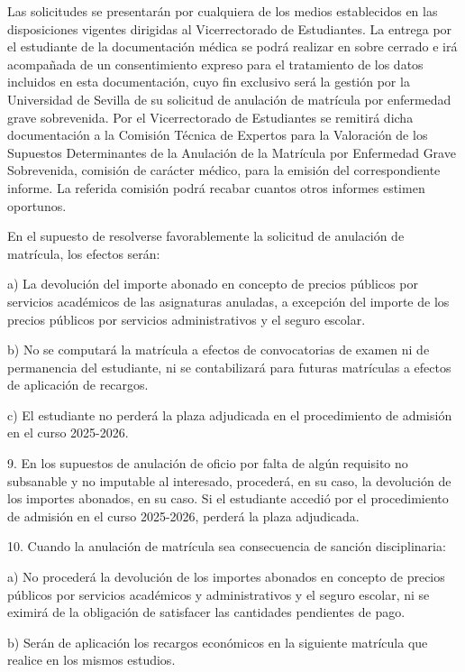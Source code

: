 \documentclass{article}
\begin{document}
\begin{itemize}
\begin{itemize}
\begin{scriptsize}
                  Las solicitudes se presentarán por cualquiera de los medios establecidos en las disposiciones vigentes dirigidas al Vicerrectorado de Estudiantes. La entrega por el estudiante de la documentación médica se podrá realizar en sobre cerrado e irá acompañada de un consentimiento expreso para el tratamiento de los datos incluidos en esta documentación, cuyo fin exclusivo será la gestión por la Universidad de Sevilla de su solicitud de anulación de matrícula por enfermedad grave sobrevenida. Por el Vicerrectorado de Estudiantes se remitirá dicha documentación a la Comisión Técnica de Expertos para la Valoración de los Supuestos Determinantes de la Anulación de la Matrícula por Enfermedad Grave Sobrevenida, comisión de carácter médico, para la emisión del correspondiente informe. La referida comisión podrá recabar cuantos otros informes estimen oportunos.

                  En el supuesto de resolverse favorablemente la solicitud de anulación de matrícula, los efectos serán:

                  a) La devolución del importe abonado en concepto de precios públicos por servicios académicos de las asignaturas anuladas, a excepción del importe de los precios públicos por servicios administrativos y el seguro escolar.

                  b) No se computará la matrícula a efectos de convocatorias de examen ni de permanencia del estudiante, ni se contabilizará para futuras matrículas a efectos de aplicación de recargos.

                  c) El estudiante no perderá la plaza adjudicada en el procedimiento de admisión en el curso 2025-2026.

                  9. En los supuestos de anulación de oficio por falta de algún requisito no subsanable y no imputable al interesado, procederá, en su caso, la devolución de los importes abonados, en su caso. Si el estudiante accedió por el procedimiento de admisión en el curso 2025-2026, perderá la plaza adjudicada.

                  10. Cuando la anulación de matrícula sea consecuencia de sanción disciplinaria:

                  a) No procederá la devolución de los importes abonados en concepto de precios públicos por servicios académicos y administrativos y el seguro escolar, ni se eximirá de la obligación de satisfacer las cantidades pendientes de pago.

                  b) Serán de aplicación los recargos económicos en la siguiente matrícula que realice en los mismos estudios.


\end{scriptsize}
\end{itemize}
\end{itemize}
\end{document}
